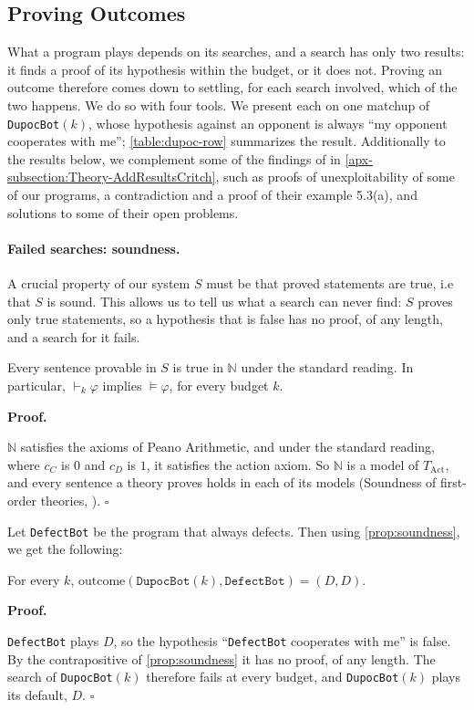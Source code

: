 \documentclass[twoside,11pt]{article}
\renewcommand{\BlackBox}{\ensuremath{\square}}
\renewenvironment{proof}[1][Proof]{%
  \par\noindent\textbf{#1.}\enspace\ignorespaces
}{%
  \ifhmode\unskip\nobreak\hfill\quad\else\noindent\hfill\fi
  \BlackBox\par\addvspace{2mm}%
}
\begin{document}
\subsection{Proving Outcomes}
\label{subsection:Theory-Outcomes}

What a program plays depends on its searches, and a search has only two results: it finds a proof of its hypothesis within the budget, or it does not. Proving an outcome therefore comes down to settling, for each search involved, which of the two happens. We do so with four tools. We present each on one matchup of \texttt{DupocBot}$(k)$, whose hypothesis against an opponent is always \enquote{my opponent cooperates with me}; \cref{table:dupoc-row} summarizes the result. Additionally to the results below, we complement some of the findings of \citet{Critch} in \cref{apx-subsection:Theory-AddResultsCritch}, such as proofs of unexploitability of some of our programs, a contradiction and a proof of their example 5.3(a), and solutions to some of their open problems.

\paragraph{Failed searches: soundness.} A crucial property of our system $S$ must be that proved statements are true, i.e that $S$ is sound. This allows us to tell us what a search can never find: $S$ proves only true statements, so a hypothesis that is false has no proof, of any length, and a search for it fails.
\begin{proposition}[Soundness]\label{prop:soundness}
Every sentence provable in $S$ is true in $\mathbb{N}$ under the standard reading. In particular, $\vdash_k \varphi$ implies $\models \varphi$, for every budget $k$.
\end{proposition}
\begin{proof}
$\mathbb{N}$ satisfies the axioms of Peano Arithmetic, and under the standard reading, where $c_C$ is $0$ and $c_D$ is $1$, it satisfies the action axiom. So $\mathbb{N}$ is a model of $T_{\mathrm{Act}}$, and every sentence a theory proves holds in each of its models (Soundness of first-order theories, \citealp[Section~2.5]{soundness_first_order}).
\end{proof}
Let \texttt{DefectBot} be the program that always defects. Then using \cref{prop:soundness}, we get the following:
\begin{proposition}\label{prop:dupoc-defect}
For every $k$, $\mathrm{outcome}(\texttt{DupocBot}(k), \texttt{DefectBot}) = (D, D)$.
\end{proposition}
\begin{proof}
\texttt{DefectBot} plays $D$, so the hypothesis \enquote{\texttt{DefectBot} cooperates with me} is false. By the contrapositive of \cref{prop:soundness} it has no proof, of any length. The search of \texttt{DupocBot}$(k)$ therefore fails at every budget, and \texttt{DupocBot}$(k)$ plays its default, $D$.
\end{proof}
\end{document}
